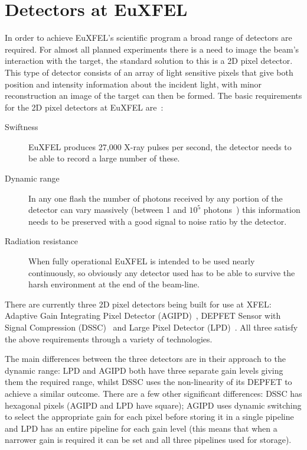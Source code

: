 \section{Detectors at EuXFEL} %
\label{sub:detectors_at_euxfel}
In order to achieve EuXFEL's scientific program a broad range of detectors are required. For almost all planned experiments there is a need to image the beam's interaction with the target, the standard solution to this is a 2D pixel detector. This type of detector consists of an array of light sensitive pixels that give both position and intensity information about the incident light, with minor reconstruction an image of the target can then be formed. The basic requirements for the 2D pixel detectors at EuXFEL are~\cite{xfel_tdr}:
\begin{description}
    \item[Swiftness] EuXFEL produces 27,000 X-ray pulses per second, the detector needs to be able to record a large number of these.
    \item[Dynamic range] In any one flash the number of photons received by any portion of the detector can vary massively (between 1 and \(10^5\) photons~\cite{lpd_manual}) this information needs to be preserved with a good signal to noise ratio by the detector.
    \item[Radiation resistance] When fully operational EuXFEL is intended to be used nearly continuously, so obviously any detector used has to be able to survive the harsh environment at the end of the beam-line.
\end{description}

There are currently three 2D pixel detectors being built for use at XFEL: Adaptive Gain Integrating Pixel Detector (AGIPD)~\cite{agipd_spec}, DEPFET Sensor with Signal Compression (DSSC)~\cite{dssc_spec} and Large Pixel Detector (LPD)~\cite{lpd_spec}. All three satisfy the above requirements through a variety of technologies.

The main differences between the three detectors are in their approach to the dynamic range: LPD and AGIPD both have three separate gain levels giving them the required range, whilst DSSC uses the non-linearity of its DEPFET to achieve a similar outcome. There are a few other significant differences: DSSC has hexagonal pixels (AGIPD and LPD have square); AGIPD uses dynamic switching to select the appropriate gain for each pixel before storing it in a single pipeline and LPD has an entire pipeline for each gain level (this means that when a narrower gain is required it can be set and all three pipelines used for storage). 

